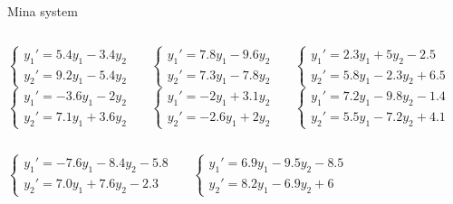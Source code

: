 \documentclass[12pt, aspectratio=169, xcolor={dvipsnames,svgnames}]{beamer}
\begin{document}
\begin{frame}{Mina system}
    \begin{columns}
        \[
        \begin{cases}
            y_1'=5.4y_1-3.4y_2\\
            y_2'=9.2y_1-5.4y_2
        \end{cases}
        \]
        \[
        \begin{cases}
            y_1'=-3.6y_1-2y_2\\
            y_2'=7.1y_1+3.6y_2
        \end{cases}
        \]

        \[
        \begin{cases}
            y_1'=7.8y_1-9.6y_2\\
            y_2'=7.3y_1-7.8y_2
        \end{cases}
        \]
        \[
        \begin{cases}
            y_1'=-2y_1+3.1y_2\\
            y_2'=-2.6y_1+2y_2
        \end{cases}
        \]

        \[
        \begin{cases}
            y_1'=2.3y_1+5y_2-2.5\\
            y_2'=5.8y_1-2.3y_2+6.5
        \end{cases}
        \]
        \[
        \begin{cases}
            y_1'=7.2y_1-9.8y_2-1.4\\
            y_2'=5.5y_1-7.2y_2+4.1
        \end{cases}
        \]
    \end{columns}

    \begin{columns}
        \[
        \begin{cases}
            y_1'=-7.6y_1-8.4y_2-5.8\\
            y_2'=7.0y_1+7.6y_2-2.3
        \end{cases}
        \]

        \[
        \begin{cases}
            y_1'=6.9y_1-9.5y_2-8.5\\
            y_2'=8.2y_1-6.9y_2+6
        \end{cases}
        \]
    \end{columns}
\end{frame}
\end{document}
